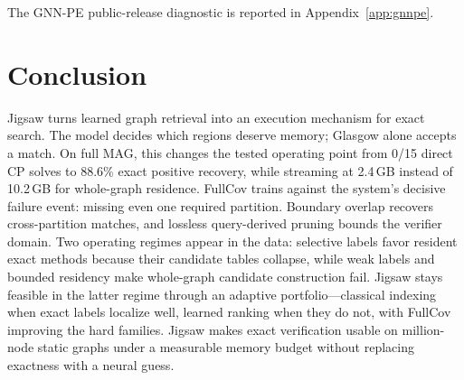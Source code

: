 \documentclass{article}
\begin{document}
The GNN-PE public-release diagnostic is reported in Appendix~\ref{app:gnnpe}.

\section{Conclusion}

Jigsaw turns learned graph retrieval into an execution mechanism for exact search. The model decides which regions deserve memory; Glasgow alone accepts a match. On full MAG, this changes the tested operating point from 0/15 direct CP solves to 88.6\% exact positive recovery, while streaming at 2.4\,GB instead of 10.2\,GB for whole-graph residence. FullCov trains against the system's decisive failure event: missing even one required partition. Boundary overlap recovers cross-partition matches, and lossless query-derived pruning bounds the verifier domain. Two operating regimes appear in the data: selective labels favor resident exact methods because their candidate tables collapse, while weak labels and bounded residency make whole-graph candidate construction fail. Jigsaw stays feasible in the latter regime through an adaptive portfolio---classical indexing when exact labels localize well, learned ranking when they do not, with FullCov improving the hard families. Jigsaw makes exact verification usable on million-node static graphs under a measurable memory budget without replacing exactness with a neural guess.

\end{document}
